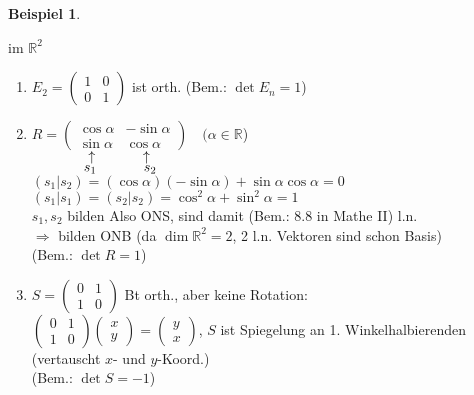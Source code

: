 \documentclass[a4paper,11pt]{article}
\newtheorem{bsp}[definition]{Beispiel}
\newcommand{\hsp}{\hspace{5mm}}
\begin{document}
\begin{bsp}
\end{bsp}
im $\mathbb{R}^2$
\begin{enumerate}[label=\alph*)]
	\item $E_2=\begin{pmatrix}1 & 0 \\0 & 1\end{pmatrix}$ ist orth. \hsp (Bem.: $\det E_n=1$)
	\item $R=\begin{pmatrix}\cos\alpha & -\sin\alpha \\ \sin\alpha & \cos\alpha\end{pmatrix}\quad(\alpha\in\mathbb{R}$) \\
	$\phantom{}\hspace{13mm}\uparrow\hspace{12mm}\uparrow$ \\
	$\phantom{}\hspace{13mm}s_1\hspace{12mm}s_2$ \\
	$(s_1\vert s_2)=(\cos\alpha)(-\sin\alpha)+\sin\alpha\cos\alpha=0$ \\
	$(s_1\vert s_1)=(s_2\vert s_2)=\cos^2\alpha+\sin^2\alpha=1$ \\
	$s_1,s_2$ bilden Also ONS, sind damit (Bem.: 8.8 in Mathe II) l.n. \\
	$\Rightarrow$ bilden ONB (da $\dim\mathbb{R}^2=2$, 2 l.n. Vektoren sind schon Basis) \\
	(Bem.: $\det R=1$)
	\item $S=\begin{pmatrix}0 & 1 \\ 1 & 0\end{pmatrix}$ Bt orth., aber keine Rotation: \\
	$\begin{pmatrix}0 & 1 \\ 1 & 0\end{pmatrix}\begin{pmatrix}x\\y\end{pmatrix}=\begin{pmatrix}y\\x\end{pmatrix}$, $S$ ist Spiegelung an 1. Winkelhalbierenden (vertauscht $x$- und $y$-Koord.) \\
	(Bem.: $\det S=-1$)
\end{enumerate}
\end{document}
